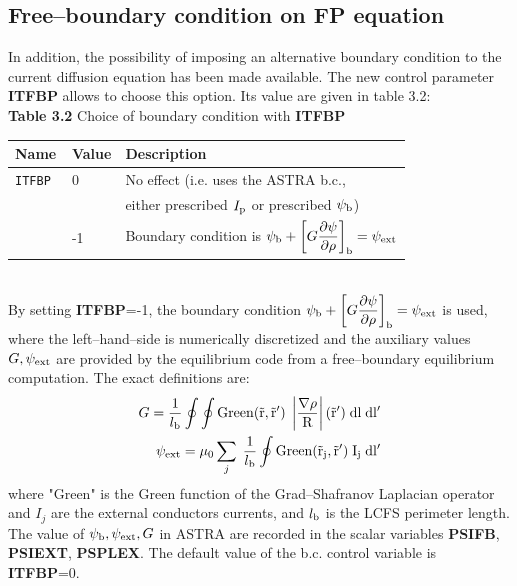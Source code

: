 \subsection{Free--boundary condition on FP equation}
In addition, the possibility of imposing an alternative boundary condition
to the current diffusion equation has been made available. The new control parameter
{\bf ITFBP} allows to choose this option. Its value are given in table 3.2:
\\
{\bf Table 3.2} Choice of boundary condition with {\bf ITFBP}\\[2ex]
\begin{tabular}{|l|l|l|}					\hline
\bf Name	&\bf Value & Description\\ \hline
\tt ITFBP 	& 0 & No effect (i.e. uses the ASTRA b.c., \\
\tt & & either prescribed $I_{\rm p}$ or prescribed $\psi_{\rm b}$)\\
\tt  	& -1 &  Boundary condition is $\displaystyle \psi_{\rm b}+\left[G \frac{\partial\psi}{\partial\rho}\right]_{\rm b}=\psi_{\rm ext}$\\ 
\hline
\end{tabular}
\bigskip\\
By setting {\bf ITFBP}=-1, the boundary condition $\displaystyle \psi_{\rm b}+\left[G \frac{\partial\psi}{\partial\rho}\right]_{\rm b}=\psi_{\rm ext}$ is used, where the left--hand--side is numerically discretized and the auxiliary values $G,\psi_{\rm ext}$ are provided by the equilibrium code from a free--boundary equilibrium computation. The exact definitions are: 
\begin{eqnarray}
G=\frac{1}{l_{\rm b}}\oint\oint \rm{Green}(\vec{r},\vec{r}') \; \left\vert\frac{\nabla{\rho}}{R}\right\vert(\vec{r}') \; dl \; dl' \\ \nonumber
\psi_{\rm ext}=\mu_0 \sum_j \; \frac{1}{l_{\rm b}}\oint  \rm{Green}(\vec{r}_j,\vec{r}') \; I_j \; dl'
\label{Gpsiextdefeq}
\end{eqnarray}
where "Green" is the Green function of the Grad--Shafranov Laplacian operator and $I_j$ are the external conductors currents, and $l_{\rm b}$ is the LCFS perimeter length.
The value of $\psi_{\rm b},\psi_{\rm ext},G$ in ASTRA are recorded in the scalar variables {\bf PSIFB}, {\bf PSIEXT}, {\bf PSPLEX}.
The default value of the b.c. control variable is {\bf ITFBP}=0.
%
